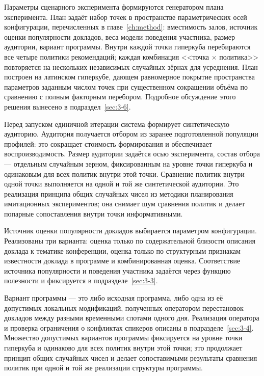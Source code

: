 Параметры сценарного эксперимента формируются генератором плана эксперимента. План задаёт набор точек в пространстве параметрических осей конфигурации, перечисленных в главе~\ref{ch:method}: вместимость залов, источник оценки популярности докладов, веса модели поведения участника, размер аудитории, вариант программы. Внутри каждой точки гиперкуба перебираются все четыре политики рекомендаций; каждая комбинация <<точка $\times$ политика>> повторяется на нескольких независимых случайных зёрнах для усреднения. План построен на латинском гиперкубе, дающем равномерное покрытие пространства параметров заданным числом точек при существенном сокращении объёма по сравнению с полным факторным перебором. Подробное обсуждение этого решения вынесено в подраздел~\ref{sec:3-6}.

Перед запуском единичной итерации система формирует синтетическую аудиторию. Аудитория получается отбором из заранее подготовленной популяции профилей: это сокращает стоимость формирования и обеспечивает воспроизводимость. Размер аудитории задаётся осью эксперимента, состав отбора --- отдельным случайным зерном, фиксированным на уровне точки гиперкуба и одинаковым для всех политик внутри этой точки. Сравнение политик внутри одной точки выполняется на одной и той же синтетической аудитории. Это реализация принципа общих случайных чисел из методики планирования имитационных экспериментов; она снимает шум сравнения политик и делает попарные сопоставления внутри точки информативными.

Источник оценки популярности докладов выбирается параметром конфигурации. Реализованы три варианта: оценка только по содержательной близости описания доклада к тематике конференции, оценка только по структурным признакам известности доклада в программе и комбинированная оценка. Соответствие источника популярности и поведения участника задаётся через функцию полезности и фиксируется в подразделе~\ref{sec:3-3}.

Вариант программы --- это либо исходная программа, либо одна из её допустимых локальных модификаций, полученных оператором перестановок докладов между разными временными слотами одного дня. Реализация оператора и проверка ограничения о конфликтах спикеров описаны в подразделе~\ref{sec:3-4}. Множество допустимых вариантов программы фиксируется на уровне точки гиперкуба и одинаково для всех политик внутри этой точки; это продолжает принцип общих случайных чисел и делает сопоставимыми результаты сравнения политик при одной и той же реализации структуры программы.

